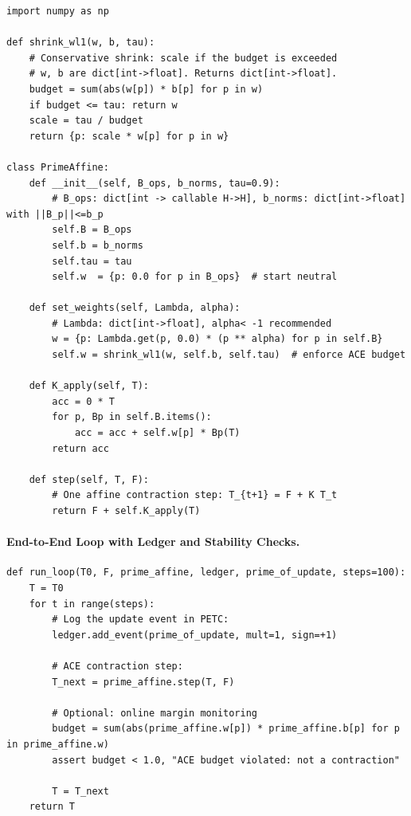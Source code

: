 \documentclass[11pt]{article}
\theoremstyle{definition}
\theoremstyle{remark}
\newcommand{\1}{\mathbf{1}}
\begin{document}
\begin{verbatim}
import numpy as np

def shrink_wl1(w, b, tau):
    # Conservative shrink: scale if the budget is exceeded
    # w, b are dict[int->float]. Returns dict[int->float].
    budget = sum(abs(w[p]) * b[p] for p in w)
    if budget <= tau: return w
    scale = tau / budget
    return {p: scale * w[p] for p in w}

class PrimeAffine:
    def __init__(self, B_ops, b_norms, tau=0.9):
        # B_ops: dict[int -> callable H->H], b_norms: dict[int->float] with ||B_p||<=b_p
        self.B = B_ops
        self.b = b_norms
        self.tau = tau
        self.w  = {p: 0.0 for p in B_ops}  # start neutral

    def set_weights(self, Lambda, alpha):
        # Lambda: dict[int->float], alpha< -1 recommended
        w = {p: Lambda.get(p, 0.0) * (p ** alpha) for p in self.B}
        self.w = shrink_wl1(w, self.b, self.tau)  # enforce ACE budget

    def K_apply(self, T):
        acc = 0 * T
        for p, Bp in self.B.items():
            acc = acc + self.w[p] * Bp(T)
        return acc

    def step(self, T, F):
        # One affine contraction step: T_{t+1} = F + K T_t
        return F + self.K_apply(T)
\end{verbatim}

\paragraph{End-to-End Loop with Ledger and Stability Checks.}
\begin{verbatim}
def run_loop(T0, F, prime_affine, ledger, prime_of_update, steps=100):
    T = T0
    for t in range(steps):
        # Log the update event in PETC:
        ledger.add_event(prime_of_update, mult=1, sign=+1)

        # ACE contraction step:
        T_next = prime_affine.step(T, F)

        # Optional: online margin monitoring
        budget = sum(abs(prime_affine.w[p]) * prime_affine.b[p] for p in prime_affine.w)
        assert budget < 1.0, "ACE budget violated: not a contraction"

        T = T_next
    return T
\end{verbatim}
\end{document}
